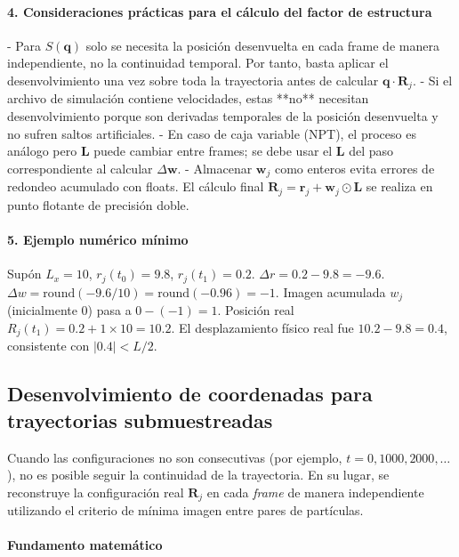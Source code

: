 \documentclass{tufte-handout}
\begin{document}
\paragraph{4. Consideraciones prácticas para el cálculo del factor de estructura}
- Para $S(\mathbf{q})$ solo se necesita la posición desenvuelta en cada frame de manera independiente, no la continuidad temporal. Por tanto, basta aplicar el desenvolvimiento una vez sobre toda la trayectoria antes de calcular $\mathbf{q}\cdot\mathbf{R}_j$.
- Si el archivo de simulación contiene velocidades, estas **no** necesitan desenvolvimiento porque son derivadas temporales de la posición desenvuelta y no sufren saltos artificiales.
- En caso de caja variable (NPT), el proceso es análogo pero $\mathbf{L}$ puede cambiar entre frames; se debe usar el $\mathbf{L}$ del paso correspondiente al calcular $\Delta \mathbf{w}$.
- Almacenar $\mathbf{w}_j$ como enteros evita errores de redondeo acumulado con floats. El cálculo final $\mathbf{R}_j = \mathbf{r}_j + \mathbf{w}_j \odot \mathbf{L}$ se realiza en punto flotante de precisión doble.

\paragraph{5. Ejemplo numérico mínimo}
Supón $L_x=10$, $r_j(t_0)=9.8$, $r_j(t_1)=0.2$.  
$\Delta r = 0.2 - 9.8 = -9.6$.  
$\Delta w = \text{round}(-9.6/10) = \text{round}(-0.96) = -1$.  
Imagen acumulada $w_j$ (inicialmente $0$) pasa a $0 - (-1) = 1$.  
Posición real $R_j(t_1) = 0.2 + 1 \times 10 = 10.2$.  
El desplazamiento físico real fue $10.2 - 9.8 = 0.4$, consistente con $|0.4| < L/2$.

\newpage

\subsection{Desenvolvimiento de coordenadas para trayectorias submuestreadas}

Cuando las configuraciones no son consecutivas (por ejemplo, $t = 0, 1000, 2000, \dots$), no es posible seguir la continuidad de la trayectoria. En su lugar, se reconstruye la configuración real $\mathbf{R}_j$ en cada \textit{frame} de manera independiente utilizando el criterio de mínima imagen entre pares de partículas.



\paragraph*{Fundamento matemático}
\end{document}
